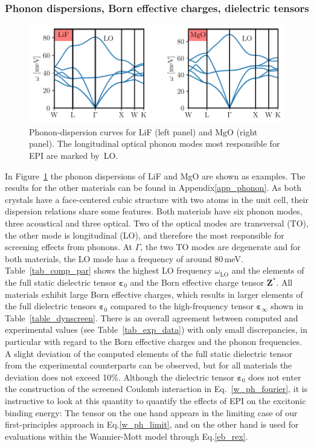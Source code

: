 \subsubsection{Phonon dispersions, Born effective charges, dielectric tensors}
\begin{figure}[t]
\captionsetup{format=plain}
\includegraphics{work/plots/phonons/phonons.pdf}%
\caption[Phonon-dispersion curves for LiF and MgO.]{Phonon-dispersion curves for  LiF (left panel) and MgO (right panel). The longitudinal optical phonon modes most responsible for EPI are marked by~LO. \label{phonon_figure}}
\end{figure}
In Figure~\ref{phonon_figure} the phonon dispersions of LiF and MgO are shown as examples. The results for the other materials can be found in Appendix\;\ref{app_phonon}. As both crystals have a face-centered cubic structure with two atoms in the unit cell, their dispersion relations share some features. Both materials have six phonon modes, three acoustical and three optical. Two of the optical modes are transversal (TO), the other mode is longitudinal (LO), and therefore the most responsible for screening effects from phonons. At $\Gamma$, the two TO modes are degenerate and for both materials, the LO mode has a frequency of around 80\,meV.
\vfill
\newpage
Table~\ref{tab_comp_par}  shows the highest LO frequency $\omega^{\phantom{I}}_\text{LO}$ and the elements of the full static dielectric tensor $\boldsymbol{\varepsilon}_0$ and the Born effective charge tensor $\mathbf{Z}^*$. All materials exhibit large Born effective charges, which results in larger elements of the full dielectric tensors $\boldsymbol{\varepsilon}_0$ compared to the high-frequency tensor $\boldsymbol{\varepsilon}_\infty$ shown in Table~\ref{table_dynscreen}. 
 There is an overall agreement between computed and experimental values (see Table~\ref{tab_exp_data}) with only small discrepancies, in particular with regard to the Born effective charges and the phonon frequencies. A slight deviation of the computed elements of the full static dielectric tensor from the experimental counterparts can be observed, but for all materials the deviation does not exceed 10\%.  Although the dielectric tensor $\boldsymbol{\varepsilon}_0$ does not enter the construction of the screened Coulomb interaction in Eq.~\eqref{w_ph_fourier}, it is instructive to look at this quantity to quantify the effects of EPI on the excitonic binding energy: The tensor on the one hand appears in the limiting case of our first-principles approach in Eq.\;\eqref{w_ph_limit}, and on the other hand is used for evaluations within the Wannier-Mott model through Eq.\;\eqref{eb_rex}.

